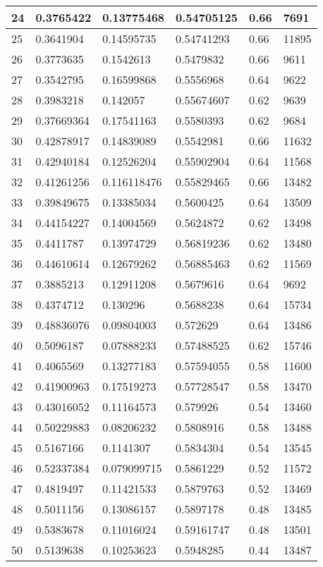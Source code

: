 \begin{longtable}{|l|l|l|l|l|l|}
24 & 0.3765422 & 0.13775468 & 0.54705125 & 0.66 & 7691 \\ \hline 
25 & 0.3641904 & 0.14595735 & 0.54741293 & 0.66 & 11895 \\ \hline 
26 & 0.3773635 & 0.1542613 & 0.5479832 & 0.66 & 9611 \\ \hline 
27 & 0.3542795 & 0.16599868 & 0.5556968 & 0.64 & 9622 \\ \hline 
28 & 0.3983218 & 0.142057 & 0.55674607 & 0.62 & 9639 \\ \hline 
29 & 0.37669364 & 0.17541163 & 0.5580393 & 0.62 & 9684 \\ \hline 
30 & 0.42878917 & 0.14839089 & 0.5542981 & 0.66 & 11632 \\ \hline 
31 & 0.42940184 & 0.12526204 & 0.55902904 & 0.64 & 11568 \\ \hline 
32 & 0.41261256 & 0.116118476 & 0.55829465 & 0.66 & 13482 \\ \hline 
33 & 0.39849675 & 0.13385034 & 0.5600425 & 0.64 & 13509 \\ \hline 
34 & 0.44154227 & 0.14004569 & 0.5624872 & 0.62 & 13498 \\ \hline 
35 & 0.4411787 & 0.13974729 & 0.56819236 & 0.62 & 13480 \\ \hline 
36 & 0.44610614 & 0.12679262 & 0.56885463 & 0.62 & 11569 \\ \hline 
37 & 0.3885213 & 0.12911208 & 0.5679616 & 0.64 & 9692 \\ \hline 
38 & 0.4374712 & 0.130296 & 0.5688238 & 0.64 & 15734 \\ \hline 
39 & 0.48836076 & 0.09804003 & 0.572629 & 0.64 & 13486 \\ \hline 
40 & 0.5096187 & 0.07888233 & 0.57488525 & 0.62 & 15746 \\ \hline 
41 & 0.4065569 & 0.13277183 & 0.57594055 & 0.58 & 11600 \\ \hline 
42 & 0.41900963 & 0.17519273 & 0.57728547 & 0.58 & 13470 \\ \hline 
43 & 0.43016052 & 0.11164573 & 0.579926 & 0.54 & 13460 \\ \hline 
44 & 0.50229883 & 0.08206232 & 0.5808916 & 0.58 & 13488 \\ \hline 
45 & 0.5167166 & 0.1141307 & 0.5834304 & 0.54 & 13545 \\ \hline 
46 & 0.52337384 & 0.079099715 & 0.5861229 & 0.52 & 11572 \\ \hline 
47 & 0.4819497 & 0.11421533 & 0.5879763 & 0.52 & 13469 \\ \hline 
48 & 0.5011156 & 0.13086157 & 0.5897178 & 0.48 & 13485 \\ \hline 
49 & 0.5383678 & 0.11016024 & 0.59161747 & 0.48 & 13501 \\ \hline 
50 & 0.5139638 & 0.10253623 & 0.5948285 & 0.44 & 13487 \\ \hline 
\end{longtable}
